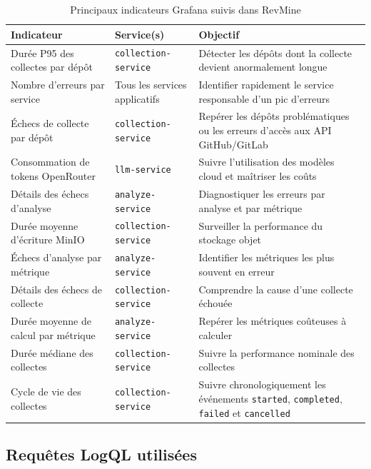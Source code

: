 \begin{table}[H]
\centering
\scriptsize
\caption{Principaux indicateurs Grafana suivis dans RevMine}
\label{tab:grafana-indicateurs}
\begin{tabular}{|>{\raggedright\arraybackslash}p{4cm}
                |>{\raggedright\arraybackslash}p{3.2cm}
                |>{\raggedright\arraybackslash}p{6cm}|}
\hline
\textbf{Indicateur} & \textbf{Service(s)} & \textbf{Objectif} \\
\hline
Durée P95 des collectes par dépôt & \texttt{collection-service} & Détecter les dépôts dont la collecte devient anormalement longue \\
\hline
Nombre d'erreurs par service & Tous les services applicatifs & Identifier rapidement le service responsable d'un pic d'erreurs \\
\hline
Échecs de collecte par dépôt & \texttt{collection-service} & Repérer les dépôts problématiques ou les erreurs d'accès aux API GitHub/GitLab \\
\hline
Consommation de tokens OpenRouter & \texttt{llm-service} & Suivre l'utilisation des modèles cloud et maîtriser les coûts \\
\hline
Détails des échecs d'analyse & \texttt{analyze-service} & Diagnostiquer les erreurs par analyse et par métrique \\
\hline
Durée moyenne d'écriture MinIO & \texttt{collection-service} & Surveiller la performance du stockage objet \\
\hline
Échecs d'analyse par métrique & \texttt{analyze-service} & Identifier les métriques les plus souvent en erreur \\
\hline
Détails des échecs de collecte & \texttt{collection-service} & Comprendre la cause d'une collecte échouée \\
\hline
Durée moyenne de calcul par métrique & \texttt{analyze-service} & Repérer les métriques coûteuses à calculer \\
\hline
Durée médiane des collectes & \texttt{collection-service} & Suivre la performance nominale des collectes \\
\hline
Cycle de vie des collectes & \texttt{collection-service} & Suivre chronologiquement les événements \texttt{started}, \texttt{completed}, \texttt{failed} et \texttt{cancelled} \\
\hline
\end{tabular}
\end{table}

\subsection{Requêtes LogQL utilisées}

